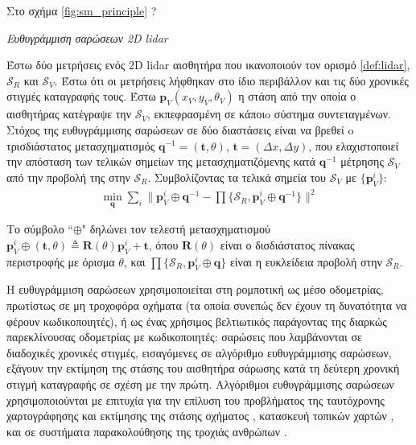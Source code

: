 Στο σχήμα \ref{fig:sm_principle} ?

\begin{bw_box}
\begin{definition}
\label{def:sm}
\textit{Ευθυγράμμιση σαρώσεων 2D lidar}

Έστω δύο μετρήσεις ενός 2D lidar αισθητήρα που ικανοποιούν τον ορισμό
\ref{def:lidar}, $\mathcal{S}_R$ και $\mathcal{S}_V$. Έστω ότι οι μετρήσεις
λήφθηκαν στο ίδιο περιβάλλον και τις δύο χρονικές στιγμές καταγραφής τους. Έστω
$\bm{p}_V(x_V,y_V,\theta_V)$ η στάση από την οποία ο αισθητήρας κατέγραψε την
$\mathcal{S}_V$, εκπεφρασμένη σε κάποιo σύστημα συντεταγμένων.  Στόχος της
ευθυγράμμισης σαρώσεων σε δύο διαστάσεις είναι να βρεθεί o τρισδιάστατος
μετασχηματισμός $\bm{q}^{-1} = (\bm{t}, \theta)$, $\bm{t} = (\Delta x, \Delta y)$,
που ελαχιστοποιεί την απόσταση των τελικών σημείων της μετασχηματιζόμενης κατά
$\bm{q}^{-1}$ μέτρησης $\mathcal{S}_V$ από την προβολή της στην $\mathcal{S}_R$.
Συμβολίζοντας τα τελικά σημεία του $\mathcal{S}_V$ με $\{\bm{p}_V^i\}$:
\begin{align}
  \underset{\bm{q}}{\min} \sum\limits_i \Big\| \bm{p}_V^i \oplus \bm{q}^{-1} - \prod \{ \mathcal{S}_R, \bm{p}_V^i \oplus \bm{q}^{-1} \}\Big\|^2
  \label{eq:sm_def}
\end{align}

Το σύμβολο ``$\oplus$" δηλώνει τον τελεστή μετασχηματισμού $\bm{p}_V^i \oplus
(\bm{t}, \theta) \triangleq \bm{R}(\theta) \bm{p}^i_V + \bm{t}$, όπου
$\bm{R}(\theta)$ είναι ο δισδιάστατος πίνακας περιστροφής με όρισμα
$\theta$, και $\prod\{\mathcal{S}_R, \bm{p}_V^i \oplus \bm{q} \}$ είναι η
ευκλείδεια προβολή στην $\mathcal{S}_R$.
\end{definition}
\end{bw_box}



\begin{bw_box}
\begin{remark}
Η ευθυγράμμιση σαρώσεων χρησιμοποιείται στη ρομποτική ως μέσο οδομετρίας,
πρωτίστως σε μη τροχοφόρα οχήματα (τα οποία συνεπώς δεν έχουν τη δυνατότητα να
φέρουν κωδικοποιητές), ή ως ένας χρήσιμος βελτιωτικός παράγοντας της διαρκώς
παρεκλίνουσας οδομετρίας με κωδικοποιητές: σαρώσεις που λαμβάνονται σε
διαδοχικές χρονικές στιγμές, εισαγόμενες σε αλγόριθμο ευθυγράμμισης
σαρώσεων, εξάγουν την εκτίμηση της στάσης του αισθητήρα σάρωσης κατά τη
δεύτερη χρονική στιγμή καταγραφής σε σχέση με την πρώτη. Αλγόριθμοι
ευθυγράμμισης σαρώσεων χρησιμοποιούνται με επιτυχία για την επίλυση του
προβλήματος της ταυτόχρονης χαρτογράφησης και εκτίμησης της στάσης οχήματος
\cite{Gutmann,Hahnel,Chieh-ChihWang}, κατασκευή τοπικών χαρτών
\cite{Lacroix2002a,Minguez,Montesano2008a}, και σε συστήματα παρακολούθησης της
τροχιάς ανθρώπων \cite{Schulz}.
\end{remark}
\end{bw_box}



